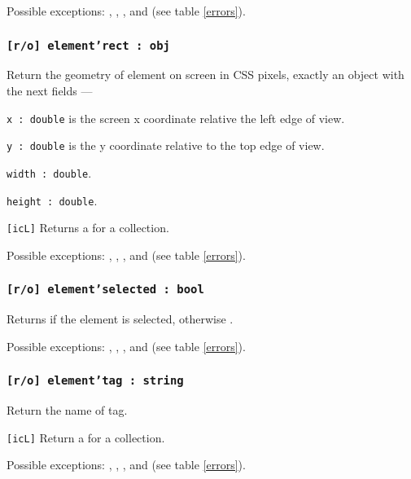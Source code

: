 Possible exceptions: , , ,  and  (see table \ref{errors}).

\subsubsection{\texttt{[r/o] element'rect : obj}}

Return the geometry of element on screen in CSS pixels, exactly an object with the next fields —
\begin{icItems}
	\item \texttt{x : double} is the screen x coordinate relative the left edge of view.
	\item \texttt{y : double} is the y coordinate relative to the top edge of view.
	\item \texttt{width : double}.
	\item \texttt{height : double}.
\end{icItems}

\texttt{[icL]} Returns a \set{} for a collection.

Possible exceptions: , , ,  and  (see table \ref{errors}).

\subsubsection{\texttt{[r/o] element'selected : bool}}

Returns \true{} if the element is selected, otherwise \false.

Possible exceptions: , , ,  and  (see table \ref{errors}).

\subsubsection{\texttt{[r/o] element'tag : string}}

Return the name of tag.

\texttt{[icL]} Return a \listtype{} for a collection.

Possible exceptions: , , ,  and  (see table \ref{errors}).


